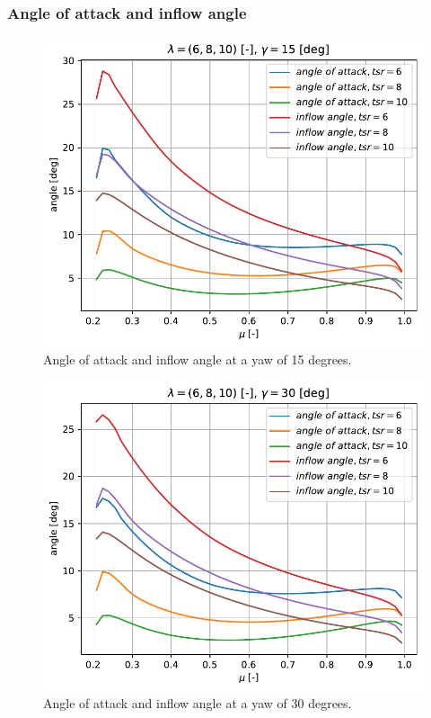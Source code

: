 \subsubsection{\textbf{Angle of attack and inflow angle} }
\begin{figure}[htbp]
	\centering
	\includegraphics[height=0.45\textheight]{./img/yaw/alpha_phi-yaw_15.pdf}
	\caption{Angle of attack and inflow angle at a yaw of 15 degrees.}
	\label{img:yaw-aoa-15}
\end{figure}
\begin{figure}[htbp]
	\centering
	\includegraphics[height=0.45\textheight]{./img/yaw/alpha_phi-yaw_30.pdf}
	\caption{Angle of attack and inflow angle at a yaw of 30 degrees.}
	\label{img:yaw-aoa-30}
\end{figure}

